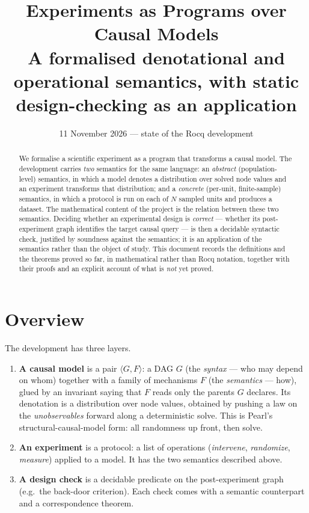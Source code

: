 \documentclass[11pt,a4paper]{article}
\title{\textbf{Experiments as Programs over Causal Models}\\[2mm]
\large A formalised denotational and operational semantics, with
static design-checking as an application}
\author{}
\date{11 November 2026 --- state of the Rocq development}
\theoremstyle{definition}
\theoremstyle{plain}
\theoremstyle{remark}
\begin{document}
\maketitle

\begin{abstract}
We formalise a scientific experiment as a program that transforms a causal
model. The development carries \emph{two} semantics for the same language:
an \emph{abstract} (population-level) semantics, in which a model denotes a
distribution over solved node values and an experiment transforms that
distribution; and a \emph{concrete} (per-unit, finite-sample) semantics, in
which a protocol is run on each of $N$ sampled units and produces a dataset.
The mathematical content of the project is the relation between these two
semantics. Deciding whether an experimental design is \emph{correct} ---
whether its post-experiment graph identifies the target causal query --- is
then a decidable syntactic check, justified by soundness against the
semantics; it is an application of the semantics rather than the object of
study. This document records the definitions and the theorems proved so
far, in mathematical rather than Rocq notation, together with their proofs
and an explicit account of what is \emph{not} yet proved.
\end{abstract}

\tableofcontents

\section{Overview}

The development has three layers.

\begin{enumerate}
\item \textbf{A causal model} is a pair $\langle G, F\rangle$: a DAG $G$
      (the \emph{syntax} --- who may depend on whom) together with a family
      of mechanisms $F$ (the \emph{semantics} --- how), glued by an invariant
      saying that $F$ reads only the parents $G$ declares. Its denotation is
      a distribution over node values, obtained by pushing a law on the
      \emph{unobservables} forward along a deterministic solve. This is
      Pearl's structural-causal-model form: all randomness up front, then
      solve.
\item \textbf{An experiment} is a protocol: a list of operations
      (\emph{intervene}, \emph{randomize}, \emph{measure}) applied to a
      model. It has the two semantics described above.
\item \textbf{A design check} is a decidable predicate on the
      post-experiment graph (e.g.\ the back-door criterion). Each check
      comes with a semantic counterpart and a correspondence theorem.
\end{enumerate}
\end{document}
